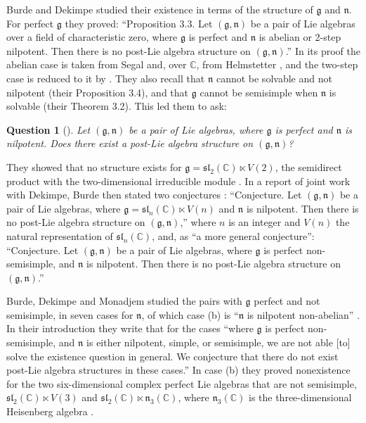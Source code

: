 \documentclass[11pt]{article}
\newtheorem{question}[theorem]{Question}
\theoremstyle{definition}
\theoremstyle{remark}
\newcommand{\g}{\mathfrak{g}}
\newcommand{\n}{\mathfrak{n}}
\begin{document}
Burde and Dekimpe \cite{BD} studied their existence in terms of the
structure of $\g$ and $\n$. For perfect $\g$ they proved: ``Proposition
3.3. Let $(\g,\n)$ be a pair of Lie algebras over a field of
characteristic zero, where $\g$ is perfect and $\n$ is abelian or 2-step
nilpotent. Then there is no post-Lie algebra structure on $(\g,\n)$.'' In
its proof the abelian case is taken from Segal \cite[Theorem 1 and
Proposition 1]{Se} and, over $\mathbb{C}$, from Helmstetter
\cite[Proposition 20]{He}, and the two-step case is reduced to it by
\cite[Proposition 4.2]{BDV}. They also recall that $\n$ cannot be solvable
and not nilpotent \cite[Proposition 4.4]{BDV} (their Proposition 3.4), and
that $\g$ cannot be semisimple when $\n$ is solvable \cite[Theorem
4.2]{BD13} (their Theorem 3.2). This led them to ask:

\begin{question}[{\cite[Question 3.5]{BD}}]
Let $(\g,\n)$ be a pair of Lie algebras, where $\g$ is perfect and $\n$ is
nilpotent. Does there exist a post-Lie algebra structure on $(\g,\n)$?
\end{question}

They showed that no structure exists for
$\g=\mathfrak{sl}_2(\mathbb{C})\ltimes V(2)$, the semidirect product with
the two-dimensional irreducible module \cite[Proposition 3.6]{BD}. In a
report of joint work with Dekimpe, Burde then stated two conjectures
\cite[p.~2689]{OWR}: ``Conjecture. Let $(\g,\n)$ be a pair of Lie
algebras, where $\g=\mathfrak{sl}_n(\mathbb{C})\ltimes V(n)$ and $\n$ is
nilpotent. Then there is no post-Lie algebra structure on $(\g,\n)$,''
where $n$ is an integer and $V(n)$ the natural representation of
$\mathfrak{sl}_n(\mathbb{C})$, and, as ``a more general conjecture'':
``Conjecture. Let $(\g,\n)$ be a pair of Lie algebras, where $\g$ is
perfect non-semisimple, and $\n$ is nilpotent. Then there is no post-Lie
algebra structure on $(\g,\n)$.''

Burde, Dekimpe and Monadjem \cite{BDM} studied the pairs with $\g$ perfect
and not semisimple, in seven cases for $\n$, of which case (b) is ``$\n$
is nilpotent non-abelian'' \cite[\S3]{BDM}. In their introduction they
write that for the cases ``where $\g$ is perfect non-semisimple, and $\n$
is either nilpotent, simple, or semisimple, we are not able [to] solve the
existence question in general. We conjecture that there do not exist
post-Lie algebra structures in these cases.'' In case (b) they proved
nonexistence for the two six-dimensional complex perfect Lie algebras that
are not semisimple, $\mathfrak{sl}_2(\mathbb{C})\ltimes V(3)$ and
$\mathfrak{sl}_2(\mathbb{C})\ltimes\mathfrak{n}_3(\mathbb{C})$, where
$\mathfrak{n}_3(\mathbb{C})$ is the three-dimensional Heisenberg algebra
\cite[Proposition 3.2]{BDM}.
\end{document}
